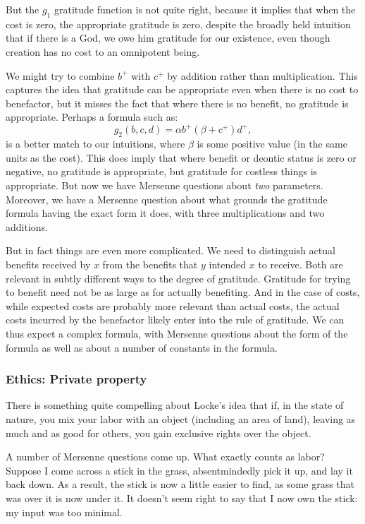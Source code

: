 But the $g_1$ gratitude function is not quite right, because it implies that when the cost is zero, the appropriate gratitude 
is zero, despite the broadly held intuition that if there is a God, we owe him gratitude for our existence, 
even though creation has no cost to an omnipotent being. 

We might try to combine $b^+$ with $c^+$ by addition rather than multiplication. This captures the idea that
gratitude can be appropriate even when there is no cost to benefactor, but it misses the fact that where there
is no benefit, no gratitude is appropriate. Perhaps a formula such as:
$$
	g_2(b,c,d)=\alpha b^+ (\beta+c^+) d^+,
$$	
is a better match to our intuitions, where $\beta$ is some positive value (in the same units as the cost). 
This does imply that where benefit or deontic status is zero or negative, no gratitude is appropriate, but
gratitude for costless things is appropriate. But now we have Mersenne questions about \textit{two} parameters.
Moreover, we have a Mersenne question about what grounds the gratitude formula having the exact form it does, with three
multiplications and two additions. 

But in fact things are even more complicated. We need to distinguish actual benefits received by $x$ from
the benefits that $y$ intended $x$ to receive. Both are relevant in subtly different ways to the degree of 
gratitude. Gratitude for trying to benefit need not be as large as for actually benefiting. And in the case
of costs, while expected costs are probably more relevant than actual costs, the actual costs incurred by
the benefactor likely enter into the rule of gratitude. We can thus expect a complex formula, with Mersenne
questions about the form of the formula as well as about a number of constants in the formula.

\subsubsection{Ethics: Private property}
There is something quite compelling about Locke's idea that if, in the state of nature, you mix your labor with 
an object (including an area of land), leaving as much and as good for others, you gain exclusive rights over 
the object. 

A number of Mersenne questions come up. What exactly counts as labor? Suppose I come across a stick in 
the grass, absentmindedly pick it up, and lay it back down. As a result, the stick is now a little easier to find, as 
some grass that was over it is now under it.  It doesn't seem right to say that I now own
the stick: my input was too minimal. 


